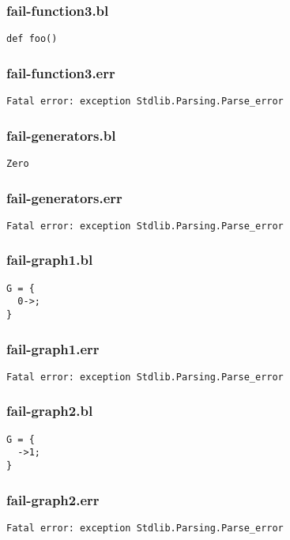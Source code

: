 \subsubsection{fail-function3.bl}
\begin{lstlisting}
def foo()\end{lstlisting}
\subsubsection{fail-function3.err}
\begin{lstlisting}
Fatal error: exception Stdlib.Parsing.Parse_error
\end{lstlisting}
\subsubsection{fail-generators.bl}
\begin{lstlisting}
Zero\end{lstlisting}
\subsubsection{fail-generators.err}
\begin{lstlisting}
Fatal error: exception Stdlib.Parsing.Parse_error
\end{lstlisting}
\subsubsection{fail-graph1.bl}
\begin{lstlisting}
G = {
  0->;
}\end{lstlisting}
\subsubsection{fail-graph1.err}
\begin{lstlisting}
Fatal error: exception Stdlib.Parsing.Parse_error
\end{lstlisting}
\subsubsection{fail-graph2.bl}
\begin{lstlisting}
G = {
  ->1;
}\end{lstlisting}
\subsubsection{fail-graph2.err}
\begin{lstlisting}
Fatal error: exception Stdlib.Parsing.Parse_error
\end{lstlisting}
